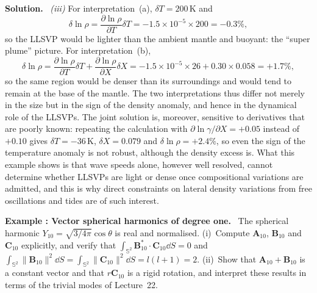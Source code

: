 \documentclass[a4paper,12pt]{paper}
\newcounter{example}
\renewenvironment{example}[1]{%
  \refstepcounter{example}%
  \begin{mdframed}[linewidth=1pt,innertopmargin=6pt,innerbottommargin=6pt]%
  \noindent\textbf{Example \theexample: #1.}\ }{%
  \end{mdframed}}
\newenvironment{solution}{\par\noindent\textbf{Solution.}\ }{\par\medskip}
\begin{document}
\begin{solution}
\medskip
\noindent\textit{(iii)} For interpretation~(a), $\delta T=200\,\mathrm{K}$ and
\begin{equation}
\delta\ln\rho=\frac{\partial\ln\rho}{\partial T}\delta T=-1.5\times10^{-5}\times200=-0.3\%,
\label{eq:30}
\end{equation}
so the LLSVP would be lighter than the ambient mantle and buoyant: the ``super plume''
picture. For interpretation~(b),
\begin{equation}
\delta\ln\rho=\frac{\partial\ln\rho}{\partial T}\delta T+\frac{\partial\ln\rho}{\partial X}\delta X
=-1.5\times10^{-5}\times26+0.30\times0.058=+1.7\%,
\label{eq:31}
\end{equation}
so the same region would be denser than its surroundings and would tend to remain at the base
of the mantle. The two interpretations thus differ not merely in the size but in the sign of
the density anomaly, and hence in the dynamical role of the LLSVPs. The joint solution is,
moreover, sensitive to derivatives that are poorly known: repeating the calculation with
$\partial\ln\gamma/\partial X=+0.05$ instead of $+0.10$ gives $\delta T=-36\,\mathrm{K}$,
$\delta X=0.079$ and $\delta\ln\rho=+2.4\%$, so even the sign of the temperature anomaly is not
robust, although the density excess is. What this example shows is that wave speeds alone,
however well resolved, cannot determine whether LLSVPs are light or dense once compositional
variations are admitted, and this is why direct constraints on lateral density variations from
free oscillations and tides are of such interest.
\end{solution}

\begin{example}{Vector spherical harmonics of degree one}
The spherical harmonic $Y_{10}=\sqrt{3/4\pi}\cos\theta$ is real and normalised. (i)~Compute
$\mathbf{A}_{10}$, $\mathbf{B}_{10}$ and $\mathbf{C}_{10}$ explicitly, and verify that
$\int_{\mathbb{S}^{2}}\mathbf{B}_{10}^{*}\cdot\mathbf{C}_{10}\dd S=0$ and
$\int_{\mathbb{S}^{2}}\|\mathbf{B}_{10}\|^{2}\dd S=\int_{\mathbb{S}^{2}}\|\mathbf{C}_{10}\|^{2}\dd S=l(l+1)=2$.
(ii)~Show that $\mathbf{A}_{10}+\mathbf{B}_{10}$ is a constant vector and that $r\mathbf{C}_{10}$
is a rigid rotation, and interpret these results in terms of the trivial modes of Lecture~22.
\end{example}
\end{document}
